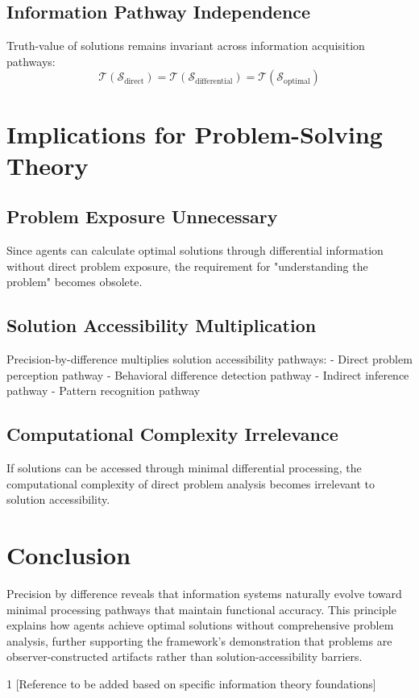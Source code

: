 \documentclass{article}
\begin{document}
\subsection{Information Pathway Independence}
Truth-value of solutions remains invariant across information acquisition pathways:
$$\mathcal{T}(\mathcal{S}_{\text{direct}}) = \mathcal{T}(\mathcal{S}_{\text{differential}}) = \mathcal{T}(\mathcal{S}_{\text{optimal}})$$

\section{Implications for Problem-Solving Theory}

\subsection{Problem Exposure Unnecessary}
Since agents can calculate optimal solutions through differential information without direct problem exposure, the requirement for "understanding the problem" becomes obsolete.

\subsection{Solution Accessibility Multiplication}
Precision-by-difference multiplies solution accessibility pathways:
- Direct problem perception pathway
- Behavioral difference detection pathway  
- Indirect inference pathway
- Pattern recognition pathway

\subsection{Computational Complexity Irrelevance}
If solutions can be accessed through minimal differential processing, the computational complexity of direct problem analysis becomes irrelevant to solution accessibility.

\section{Conclusion}

Precision by difference reveals that information systems naturally evolve toward minimal processing pathways that maintain functional accuracy. This principle explains how agents achieve optimal solutions without comprehensive problem analysis, further supporting the framework's demonstration that problems are observer-constructed artifacts rather than solution-accessibility barriers.


\begin{thebibliography}{1}
 [Reference to be added based on specific information theory foundations]
\end{thebibliography}
\end{document}
